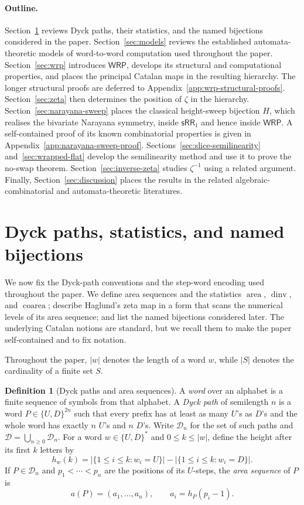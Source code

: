 \documentclass[11pt]{article}
\theoremstyle{definition}
\newtheorem{definition}[theorem]{Definition}
\newcommand{\D}{\mathcal D}
\newcommand{\WRP}{\mathsf{WRP}}
\newcommand{\SWR}{\mathsf{sRR}_1}
\newcommand{\area}{\operatorname{area}}
\newcommand{\dinv}{\operatorname{dinv}}
\newcommand{\coarea}{\operatorname{coarea}}
\begin{document}
\paragraph{Outline.}

Section~\ref{sec:dyck} reviews Dyck paths, their statistics, and the named
bijections considered in the paper.  Section~\ref{sec:models} reviews the
established automata-theoretic models of word-to-word computation used
throughout the paper.  Section~\ref{sec:wrp} introduces $\WRP$, develops its
structural and computational properties, and places the principal Catalan
maps in the resulting hierarchy.  The longer structural proofs are deferred
to Appendix~\ref{app:wrp-structural-proofs}.  Section~\ref{sec:zeta} then
determines the position of $\zeta$ in the hierarchy.
Section~\ref{sec:narayana-sweep} places the classical height-sweep bijection
$H$, which realises the bivariate Narayana symmetry, inside $\SWR$ and hence
inside $\WRP$.  A self-contained proof of its known combinatorial properties
is given in Appendix~\ref{app:narayana-sweep-proof}.
Sections~\ref{sec:slice-semilinearity} and~\ref{sec:wrapped-flat} develop the
semilinearity method and use it to prove the no-swap theorem.
Section~\ref{sec:inverse-zeta} studies $\zeta^{-1}$ using a related argument.
Finally, Section~\ref{sec:discussion} places the results in the related
algebraic-combinatorial and automata-theoretic literatures.


\section{Dyck paths, statistics, and named bijections}\label{sec:dyck}

We now fix the Dyck-path conventions and the step-word encoding used
throughout the paper.  We define area sequences and the statistics
$\area$, $\dinv$, and $\coarea$; describe Haglund's zeta map in a form
that scans the numerical levels of its area sequence; and list the named
bijections considered later.  The underlying Catalan notions are standard,
but we recall them to make the paper self-contained and to fix notation.

Throughout the paper, $|w|$ denotes the length of a word $w$, while $|S|$
denotes the cardinality of a finite set $S$.

\begin{definition}[Dyck paths and area sequences]
A \emph{word} over an alphabet is a finite sequence of symbols from that
alphabet.  A \emph{Dyck path} of semilength $n$ is a word
$P\in\{U,D\}^{2n}$ such that every prefix has at least as many $U$'s as $D$'s
and the whole word has exactly $n$ $U$'s and $n$ $D$'s.  Write $\D_n$ for the
set of such paths and $\D=\bigcup_{n\ge 0}\D_n$.  For a word
$w\in\{U,D\}^*$ and $0\le k\le |w|$, define the height after its first $k$
letters by
\[
   h_w(k)=|\{1\le i\le k:w_i=U\}|-|\{1\le i\le k:w_i=D\}|.
\]
If $P\in\D_n$ and $p_1<\cdots<p_n$ are the positions of its $U$-steps, the
\emph{area sequence} of $P$ is
\[
   a(P)=(a_1,\ldots,a_n),\qquad a_i=h_P(p_i-1).
\]
\end{definition}
\end{document}
